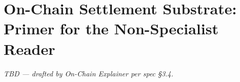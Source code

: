 \section{On-Chain Settlement Substrate: Primer for the Non-Specialist Reader}\label{sec:4}

\textit{TBD --- drafted by On-Chain Explainer per spec \S3.4.}
